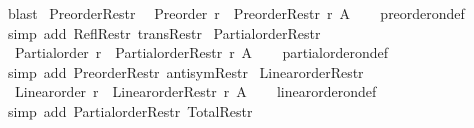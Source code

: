 \begin{isabellebody}
\ blast%
\endisatagproof
{\isafoldproof}%
%
\isadelimproof
\isanewline
%
\endisadelimproof
\isanewline
{}\isamarkupfalse%
\ Preorder{\isacharunderscore}{\kern0pt}Restr{\isacharcolon}{\kern0pt}\isanewline
\ \ {\isachardoublequoteopen}Preorder\ r\ {\isasymLongrightarrow}\ Preorder{\isacharparenleft}{\kern0pt}Restr\ r\ A{\isacharparenright}{\kern0pt}{\isachardoublequoteclose}\isanewline
%
\isadelimproof
\ \ %
\endisadelimproof
%
\isatagproof
{}\isamarkupfalse%
\ preorder{\isacharunderscore}{\kern0pt}on{\isacharunderscore}{\kern0pt}def\ \isamarkupfalse%
\ {\isacharparenleft}{\kern0pt}simp\ add{\isacharcolon}{\kern0pt}\ Refl{\isacharunderscore}{\kern0pt}Restr\ trans{\isacharunderscore}{\kern0pt}Restr{\isacharparenright}{\kern0pt}%
\endisatagproof
{\isafoldproof}%
%
\isadelimproof
\isanewline
%
\endisadelimproof
\isanewline
{}\isamarkupfalse%
\ Partial{\isacharunderscore}{\kern0pt}order{\isacharunderscore}{\kern0pt}Restr{\isacharcolon}{\kern0pt}\isanewline
\ \ {\isachardoublequoteopen}Partial{\isacharunderscore}{\kern0pt}order\ r\ {\isasymLongrightarrow}\ Partial{\isacharunderscore}{\kern0pt}order{\isacharparenleft}{\kern0pt}Restr\ r\ A{\isacharparenright}{\kern0pt}{\isachardoublequoteclose}\isanewline
%
\isadelimproof
\ \ %
\endisadelimproof
%
\isatagproof
{}\isamarkupfalse%
\ partial{\isacharunderscore}{\kern0pt}order{\isacharunderscore}{\kern0pt}on{\isacharunderscore}{\kern0pt}def\ \isamarkupfalse%
\ {\isacharparenleft}{\kern0pt}simp\ add{\isacharcolon}{\kern0pt}\ Preorder{\isacharunderscore}{\kern0pt}Restr\ antisym{\isacharunderscore}{\kern0pt}Restr{\isacharparenright}{\kern0pt}%
\endisatagproof
{\isafoldproof}%
%
\isadelimproof
\isanewline
%
\endisadelimproof
\isanewline
{}\isamarkupfalse%
\ Linear{\isacharunderscore}{\kern0pt}order{\isacharunderscore}{\kern0pt}Restr{\isacharcolon}{\kern0pt}\isanewline
\ \ {\isachardoublequoteopen}Linear{\isacharunderscore}{\kern0pt}order\ r\ {\isasymLongrightarrow}\ Linear{\isacharunderscore}{\kern0pt}order{\isacharparenleft}{\kern0pt}Restr\ r\ A{\isacharparenright}{\kern0pt}{\isachardoublequoteclose}\isanewline
%
\isadelimproof
\ \ %
\endisadelimproof
%
\isatagproof
{}\isamarkupfalse%
\ linear{\isacharunderscore}{\kern0pt}order{\isacharunderscore}{\kern0pt}on{\isacharunderscore}{\kern0pt}def\ \isamarkupfalse%
\ {\isacharparenleft}{\kern0pt}simp\ add{\isacharcolon}{\kern0pt}\ Partial{\isacharunderscore}{\kern0pt}order{\isacharunderscore}{\kern0pt}Restr\ Total{\isacharunderscore}{\kern0pt}Restr{\isacharparenright}{\kern0pt}%

\end{isabellebody}
